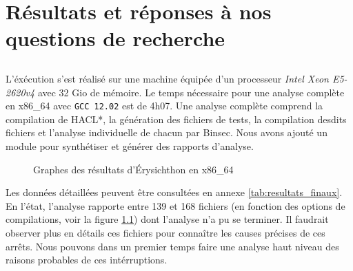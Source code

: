 \chapter{Résultats et réponses à nos questions de recherche}


\section{}

L'éxécution s'est réalisé sur une machine équipée d'un processeur \textit{Intel Xeon E5-2620v4} avec 32 Gio de mémoire. Le temps nécessaire pour une analyse complète en x86\_64 avec \texttt{GCC 12.02} est de 4h07. Une analyse complète comprend la compilation de HACL*, la génération des fichiers de tests, la compilation desdits fichiers et l'analyse individuelle de chacun par Binsec. Nous avons ajouté un module pour synthétiser et générer des rapports d'analyse.\bigbreak

\begin{figure}[!ht]
  \centering
  \caption{Graphes des résultats d'Érysichthon en x86\_64}
  \label{fig:graphe_total}
\end{figure}


Les données détaillées peuvent être consultées en annexe \ref{tab:resultats_finaux}. En l'état, l'analyse rapporte entre 139 et 168 fichiers (en fonction des options de compilations, voir la figure \ref{fig:graphe_total}) dont l'analyse n'a pu se terminer. Il faudrait observer plus en détails ces fichiers pour connaître les causes précises de ces arrêts. Nous pouvons dans un premier temps faire une analyse haut niveau des raisons probables de ces intérruptions. \medbreak

